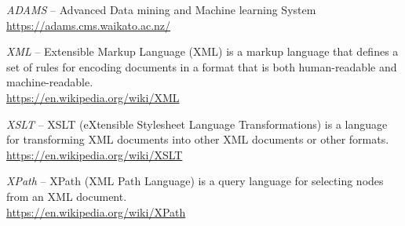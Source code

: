 
\begin{thebibliography}{999}

		\textit{ADAMS} -- Advanced Data mining and Machine learning System \\
		\url{https://adams.cms.waikato.ac.nz/}{}

		\textit{XML} -- Extensible Markup Language (XML) is a markup language 
                that defines a set of rules for encoding documents in a format that 
                is both human-readable and machine-readable. \\
		\url{https://en.wikipedia.org/wiki/XML}{}

		\textit{XSLT} -- XSLT (eXtensible Stylesheet Language Transformations) 
                is a language for transforming XML documents into other XML documents 
                or other formats. \\
		\url{https://en.wikipedia.org/wiki/XSLT}{}

		\textit{XPath} -- XPath (XML Path Language) is a query language for 
                selecting nodes from an XML document. \\
		\url{https://en.wikipedia.org/wiki/XPath}{}

\end{thebibliography}
